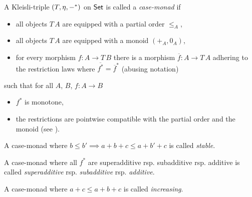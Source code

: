\documentclass[runningheads,envcountsame]{llncs}
\begin{document}
\begin{definition}
    A Kleisli-triple $(T, \munit, -^*)$ on $\mathsf{Set}$ is called a \emph{case-monad} if
    \begin{itemize}
        \item all objects $T\,A$ are equipped with a partial order $\leq_{A}$,
        \item all objects $T\,A$ are equipped with a monoid $(+_A, 0_A)$,
        \item for every morphism $f\colon A \to T\,B$ there is a morphism $\overline{f}\colon A \to T\,A$ adhering to the restriction laws where $\overline{f^*} = \overline{f}^*$ (abusing notation)
    \end{itemize}
    such that for all $A$, $B$, $f\colon A \to B$
    \begin{itemize}
        \item $f^*$ is monotone,
        \item the restrictions are pointwise compatible with the partial order and the monoid (see ).
    \end{itemize}
    
    A case-monad where $b \leq b' \implies a + b + c \leq a + b' + c$ is called \emph{stable}.
    
    A case-monad where all $f^*$ are superadditive rsp. subadditive rsp. additive is called \emph{superadditive} rsp. \emph{subadditive} rsp. \emph{additive}.
    
    A case-monad where $a + c \leq a + b + c$ is called \emph{increasing}.
\end{definition}
\end{document}
